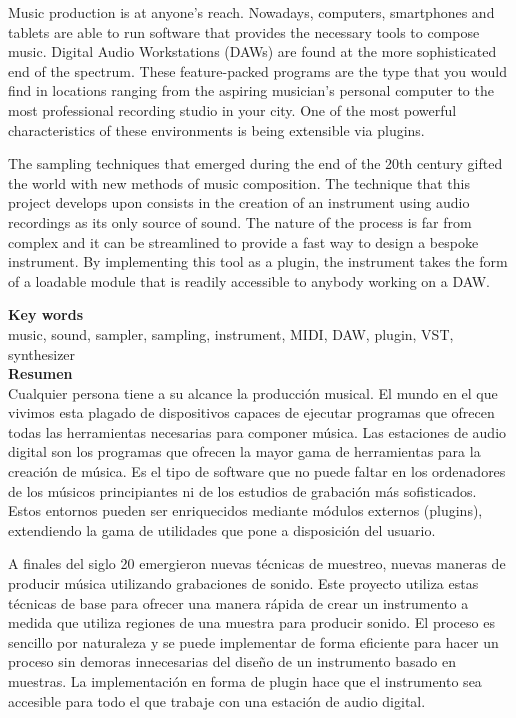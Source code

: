 \documentclass[12pt, a4paper, hidelinks]{article}
\begin{document}
	\normalsize
	Music production is at anyone's reach. Nowadays, computers, smartphones and tablets are able to run software that provides the necessary tools to compose music. Digital Audio Workstations (DAWs) are found at the more sophisticated end of the spectrum. These feature-packed programs are the type that you would find in locations ranging from the aspiring musician's personal computer to the most professional recording studio in your city. One of the most powerful characteristics of these environments is being extensible via plugins. \par	
	The sampling techniques that emerged during the end of the 20th century gifted the world with new methods of music composition. The technique that this project develops upon consists in the creation of an instrument using audio recordings as its only source of sound. The nature of the process is far from complex and it can be streamlined to provide a fast way to design a bespoke instrument. By implementing this tool as a plugin, the instrument takes the form of a loadable module that is readily accessible to anybody working on a DAW.
	
	\vspace*{\fill}
	\large
	\textbf{Key words}\\
	
	\vspace{-1em}
	\normalsize	
	\noindent music, sound, sampler, sampling, instrument, MIDI, DAW, plugin, VST, synthesizer\\

	\newpage
	\huge
	\textbf{Resumen}\\
	
	\normalsize
	Cualquier persona tiene a su alcance la producción musical. El mundo en el que vivimos esta plagado de dispositivos capaces de ejecutar programas que ofrecen todas las herramientas necesarias para componer música.	Las estaciones de audio digital son los programas que ofrecen la mayor gama de herramientas para la creación de música. Es el tipo de software que no puede faltar en los ordenadores de los músicos principiantes ni de los estudios de grabación más sofisticados. Estos entornos pueden ser enriquecidos mediante módulos externos (plugins), extendiendo la gama de utilidades que pone a disposición del usuario.\par
	A finales del siglo 20 emergieron nuevas técnicas de muestreo, nuevas maneras de producir música utilizando grabaciones de sonido. Este proyecto utiliza estas técnicas de base para ofrecer una manera rápida de crear un instrumento a medida que utiliza regiones de una muestra para producir sonido. El proceso es sencillo por naturaleza y se puede implementar de forma eficiente para hacer un proceso sin demoras innecesarias del diseño de un instrumento basado en muestras. La implementación en forma de plugin hace que el instrumento sea accesible para todo el que trabaje con una estación de audio digital.
\end{document}
